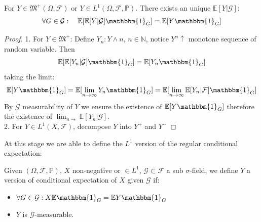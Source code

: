 \begin{lemma}
	
\end{lemma}

\begin{theorem} 
For $Y \in \mathfrak{M}^+(\Omega, \mathcal{F})$ or $Y \in L^1(\Omega, \mathcal{F}, \mathbb{P})$. There exists an unique $\mathbb{E}[Y|\mathcal{G}]$:
		\begin{equation*}
			\forall G \in \mathcal{G}: \quad \mathbb{E}[\mathbb{E}[Y|\mathcal{G}] \mathbbm{1}_G] = \mathbb{E}[Y \mathbbm{1}_G]
		\end{equation*}
\end{theorem}
\begin{proof}
	1. For $Y \in \mathfrak{M}^+$: Define $Y_n: Y \wedge n$, $n \in \mathbb{N}$, notice $Y^n \uparrow$ monotone sequence of random variable. Then 
	\begin{align*}
		\mathbb{E}[\mathbb{E}[Y_n|\mathcal{G}] \mathbbm{1}_G] =  \mathbb{E}[Y_n \mathbbm{1}_G]
	\end{align*}
	taking the limit:
	\begin{align*}
		\mathbb{E}[Y\mathbbm{1}_G] = \mathbb{E}[\lim_{n \rightarrow \infty} Y_n \mathbbm{1}_G] = \mathbb{E}[\lim_{n \rightarrow \infty}\mathbb{E}[Y_n|\mathcal{F}] \mathbbm{1}_G]
	\end{align*}
	By $\mathcal{G}$ measurability of $Y$ we ensure the existence of $\mathbb{E}[Y\mathbbm{1}_G]$ therefore the existence of $\lim_{n \rightarrow} \mathbb{E}[Y_n|\mathcal{G}]$.\\
	2. For $Y \in L^1(X, \mathcal{F})$, decompose $Y$ into $Y^+$ and $Y^-$ 
\end{proof}


At this stage we are able to define the $L^1$ version of the regular conditional expectation:
\begin{definition}
	Given $(\Omega, \mathcal{F}, \mathbb{P})$, $X$ non-negative or $\in L^1$, $\mathcal{G} \subset \mathcal{F}$ a sub $\sigma$-field, we define $Y$ a version of conditional expectation of $X$ given $\mathcal{G}$ if:
	\begin{itemize}
		\item $\forall G \in \mathcal{G}: X \mathbb{E} \mathbbm{1}_G = \mathbb{E} Y \mathbbm{1}_G$
		\item $Y$ is $\mathcal{G}$-measurable.
	\end{itemize}
\end{definition}

